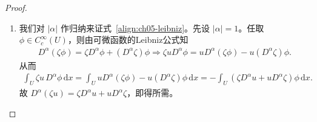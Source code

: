 \documentclass[../../main.tex]{subfiles}
\begin{document}
\begin{proof}
\begin{enumerate}[(1)]
下面验证弱导数关系在 $V$ 上依然成立。任取函数 $\phi\in C^{\infty}_{c}(V)$。在 $U\setminus V$ 上令 $\phi\equiv 0$，将 $\phi$ 零延拓为 $U$ 上的函数，此时仍有 $\phi\in C^{\infty}_{c}(U)$。
因为 $u\in W^{k,p}(U)$，所以
\begin{align*}
\int_{U}uD^{\alpha}\phi\,\mathrm{d}x=(-1)^{|\alpha|}\int_{U}D^{\alpha}u\,\phi\,\mathrm{d}x.
\end{align*}
由于 $\phi$ 在 $U\setminus V$ 上恒为 $0$，上述积分在 $U\setminus V$ 上为 $0$，因此上式等价于
\begin{align*}
\int_{V}uD^{\alpha}\phi\,\mathrm{d}x=(-1)^{|\alpha|}\int_{V}D^{\alpha}u\,\phi\,\mathrm{d}x.
\end{align*}
这对任意 $\phi\in C^{\infty}_{c}(V)$ 成立，故在 $V$ 上 $D^{\alpha}u$ 依然是 $u$ 的弱导数。综上，$u\in W^{k,p}(V)$。

\item 我们对 $|\alpha|$ 作归纳来证式~\eqref{align:ch05-leibniz}。先设 $|\alpha|=1$。任取 $\phi\in C^{\infty}_{c}(U)$，则由可微函数的Leibniz公式知
\begin{align*}
D^{\alpha}\left( \zeta \phi \right) =\zeta D^{\alpha}\phi +\left( D^{\alpha}\zeta \right) \phi \Longrightarrow \zeta uD^{\alpha}\phi =uD^{\alpha}\left( \zeta \phi \right) -u\left( D^{\alpha}\zeta \right) \phi .
\end{align*}
从而
\begin{align*}
\int_{U}\zeta u\,D^{\alpha}\phi\,\mathrm{d}x
=\int_{U}uD^{\alpha}(\zeta\phi)-u(D^{\alpha}\zeta)\phi\,\mathrm{d}x=-\int_{U}(\zeta D^{\alpha}u+uD^{\alpha}\zeta)\phi\,\mathrm{d}x.
\end{align*}
故 $D^{\alpha}(\zeta u)=\zeta D^{\alpha}u+uD^{\alpha}\zeta$，即得所需。


\end{enumerate}
\end{proof}
\end{document}
